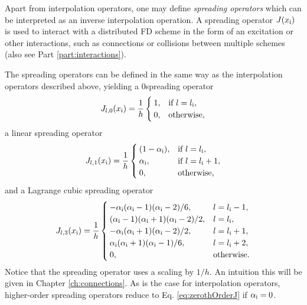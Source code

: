 Apart from interpolation operators, one may define \textit{spreading operators} which can be interpreted as an inverse interpolation operation. A spreading operator $J(x_{\text{i}})$ is used to interact with a distributed FD scheme in the form of an excitation or other interactions, such as connections or collisions between multiple schemes (also see Part \ref{part:interactions}).

The spreading operators can be defined in the same way as the interpolation operators described above, yielding a $0$\thOrder spreading operator
\begin{equation}\label{eq:zerothOrderJ}
    J_{l,0}(x_{\text{i}}) = \frac{1}{h}\begin{cases}
        1, & \text{if}\ l = l_{\text{i}},\\
        0, & \text{otherwise},
    \end{cases}
\end{equation}
a linear spreading operator
\begin{equation}\label{eq:firstOrderJ}
    J_{l,1}(x_{\text{i}}) = \frac{1}{h}\begin{cases}
        (1-\alpha_{\text{i}}), & \text{if}\ l = l_{\text{i}},\\
        \alpha_{\text{i}} , & \text{if}\ l = l_{\text{i}} + 1,\\
        0, & \text{otherwise,}
    \end{cases}
\end{equation}
and a Lagrange cubic spreading operator
\begin{equation}\label{eq:cubicJ}
    J_{l,3}(x_{\text{i}}) = \frac{1}{h}\begin{cases}
        -\alpha_{\text{i}} (\alpha_{\text{i}}-1)(\alpha_{\text{i}}-2)/6, & l = l_{\text{i}}-1,\\
        (\alpha_{\text{i}}-1)(\alpha_{\text{i}}+1)(\alpha_{\text{i}}-2)/2,  & l = l_{\text{i}},\\
        -\alpha_{\text{i}} (\alpha_{\text{i}}+1)(\alpha_{\text{i}}-2)/2, & l = l_{\text{i}} + 1,\\
        \alpha_{\text{i}} (\alpha_{\text{i}}+1)(\alpha_{\text{i}}-1)/6, & l = l_{\text{i}} + 2,\\
        0, & \text{otherwise.}
    \end{cases}
\end{equation}
Notice that the spreading operator uses a scaling by $1/h$. An intuition this will be given in Chapter \ref{ch:connections}. As is the case for interpolation operators, higher-order spreading operators reduce to Eq. \eqref{eq:zerothOrderJ} if $\alpha_{\text{i}} = 0$.

